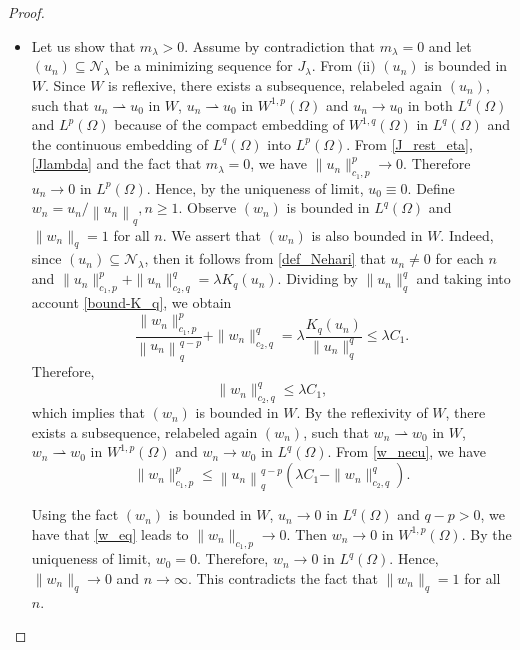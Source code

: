 \documentclass[pdflatex,sn-mathphys-num]{sn-jnl}
\theoremstyle{thmstyleone}%
\theoremstyle{thmstyletwo}%
\theoremstyle{thmstylethree}%
\theoremstyle{thmstylethree}%
\begin{document}
\begin{proof}
\begin{itemize}
\item[(iii)] 
Let us show that $m_{\lambda} >0$. Assume by contradiction that $m_{\lambda}=0$ and let $\left(u_{n}\right) \subseteq \mathcal{N}_{\lambda}$ be a minimizing sequence for $J_{\lambda}$. From $\mbox{(ii)}$  $\left(u_{n}\right)$ is bounded in $W$. 
Since $W$ is reflexive, there exists a subsequence, relabeled again $(u_n)$, such that  $u_{n} \rightharpoonup u_{0}$  in $W$, $u_n\rightharpoonup u_{0}$ in $W^{1, p}(\Omega)$ and $u_{n} \rightarrow u_{0}$ in both $L^{q}(\Omega) $ and  $L^{p}(\Omega)$ because of  the compact embedding of $W^{1,q}(\Omega)$ in $ L^q(\Omega)$ and the continuous embedding of  $L^q(\Omega)$ into $L^p(\Omega)$.
From \eqref{J_rest_eta}, \eqref{Jlambda}  and the fact that $m_\lambda=0$, we have $\|u_n \|_{c_1,p}^p\rightarrow 0.$ Therefore $u_n\to 0 \mbox{ in } L^p({\Omega})$. Hence,  by the uniqueness of limit,  $u_{0} \equiv 0.$
Define $w_{n}=u_{n} /\left\|u_{n}\right\|_{ q}, n \geq 1$.  Observe  $(w_n)$ is bounded in $L^q(\Omega)$ and $\|w_n\|_q=1$ for all $n$. We assert that $\left(w_{n}\right)$ is also bounded in $W$.
Indeed, since $\left(u_{n}\right) \subseteq \mathcal{N}_{\lambda}$, then it follows from \eqref{def_Nehari}  that   $u_n\neq 0$ for each $n$ and $\|u_n\|_{c_1,p}^p+\|u_n \|_{c_2,q}^q=\lambda K_q(u_n)$.  Dividing by $\|u_n\|_q^q$ and taking into account \eqref{bound-K_q}, we obtain  
\begin{equation}\label{w_necu}
\frac{\|w_n \|_{c_1,p}^p}{\left\|u_{n}\right\|_{q}^{q-p}}+\|w_n \|_{c_2,q}^q=\lambda \frac{K_q(u_n)}{\|u_n\|_q^q} \leqslant \lambda C_1.
\end{equation}
Therefore, 
\begin{equation*}\label{w_bound}
    \|w_n \|_{c_2,q}^q\leqslant\lambda C_1,
\end{equation*}
which implies that $\left(w_{n}\right)$ is bounded in $W$. By the reflexivity of $W$, there exists a subsequence, relabeled again $(w_n)$, such that  $w_{n} \rightharpoonup w_{0}$  in $W$, $w_{n} \rightharpoonup w_{0}$ in $W^{1, p}(\Omega)$  and $w_{n} \rightarrow w_{0}$ in $L^{q}(\Omega).$   
From \eqref{w_necu}, we have 
\begin{equation}\label{w_eq}
    \|w_n \|_{c_1,p}^p\leqslant \left\|u_{n}\right\|_{q}^{q-p}(\lambda C_1- \|w_n \|_{c_2,q}^q).
\end{equation}

Using the fact $ (w_n )$ is bounded in $W$,  $u_{n} \rightarrow 0$ in $L^{q} (\Omega)$ and $q-p>0$, we have that \eqref{w_eq} leads to  $\|w_n \|_{c_1,p}\rightarrow 0.$ Then $w_n\rightarrow 0$ in $W^{1,p}(\Omega).$  By the uniqueness of limit, $w_0=0$. Therefore, $w_{n} \rightarrow 0$ in $L^{q}(\Omega)$. Hence, $\|w_n\|_q\to 0$ and $n\to \infty$.  This contradicts the fact that $\|w_n\|_q=1$ for all $n$.
\vspace{0.3cm}


\end{itemize}
\end{proof}
\end{document}
